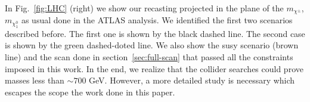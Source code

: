 \documentclass[12pt,letterpaper]{article}
\begin{document}
\begin{table}
\centering
{}
\caption{Benchmark points to looking for collider signals.}
\label{tab:B-Points}
\end{table}
%
In Fig.~\ref{fig:LHC} (right) we show our recasting projected in the plane of the $m_{\chi^{\pm}}$, $m_{\chi_1^0}$ as usual done in the ATLAS analysis. We identified the first two scenarios described before. 
%
The first one is shown by the black dashed line. 
%
The second case is shown by the green dashed-doted line. 
%
We also show the susy scenario (brown line) and the scan done in section~\ref{sec:full-scan} that passed all the constraints imposed in this work. 
%
In the end, we realize that the collider searches could prove masses less than $\sim 700$ GeV.
However, a more detailed study is necessary which escapes the scope the work done in this paper.
 
\end{document}

